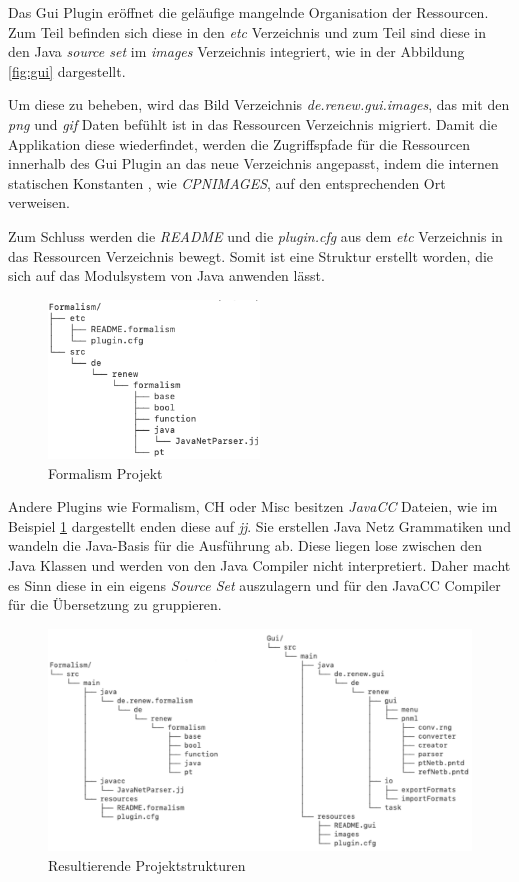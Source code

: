 	Das Gui Plugin eröffnet die geläufige mangelnde Organisation der Ressourcen. Zum Teil befinden sich diese in den \textit{etc} Verzeichnis und zum Teil sind diese in den Java \textit{source set} im \textit{images} Verzeichnis integriert, wie in der Abbildung \ref{fig:gui} dargestellt.


	Um diese zu beheben, wird das Bild Verzeichnis \textit{de.renew.gui.images}, das mit den \textit{png} und \textit{gif} Daten befühlt ist in das Ressourcen Verzeichnis migriert. Damit die Applikation diese wiederfindet, werden die Zugriffspfade für die Ressourcen innerhalb des Gui Plugin an das neue Verzeichnis angepasst, indem die internen statischen Konstanten , wie \textit{CPNIMAGES}, auf den entsprechenden Ort verweisen. 


	Zum Schluss werden die \textit{README} und die \textit{plugin.cfg}  aus dem \textit{etc} Verzeichnis in das Ressourcen Verzeichnis bewegt. Somit ist eine Struktur erstellt worden, die sich auf das Modulsystem von Java 	anwenden lässt. 
	\bigbreak

	\begin{figure}[h!]
	  \centering
	  \includegraphics[width=0.5\textwidth]{material/images/formalism_plugin.png}
	  \caption{Formalism Projekt}
	  \label{fig:formalism}
	\end{figure}

	Andere Plugins wie Formalism, CH oder Misc besitzen \textit{JavaCC} Dateien, wie im Beispiel \ref{fig:formalism} dargestellt enden diese auf \textit{jj}. Sie erstellen Java Netz Grammatiken und wandeln die Java-Basis für die Ausführung ab. Diese liegen lose zwischen den Java Klassen und werden von den Java Compiler nicht interpretiert. Daher macht es Sinn diese in ein eigens \textit{Source Set} auszulagern und für den JavaCC Compiler für die Übersetzung zu gruppieren.

	\begin{figure}[h!]
	  \centering
	  \includegraphics[width=\textwidth]{material/images/form-gui.png}
	  \caption{Resultierende Projektstrukturen}
	  \label{fig:resultStr}
	\end{figure}

